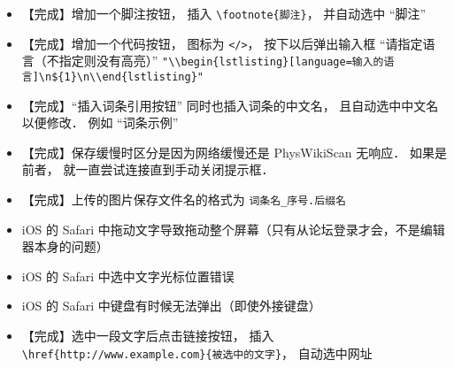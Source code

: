 \begin{itemize}
\item 【完成】增加一个脚注按钮， 插入 \lstinline|\footnote{脚注}|， 并自动选中 “脚注”

\item 【完成】增加一个代码按钮， 图标为 \lstinline|</>|， 按下以后弹出输入框 “请指定语言（不指定则没有高亮）” \lstinline|"\\begin{lstlisting}[language=输入的语言]\n${1}\n\\end{lstlisting}"|

\item 【完成】“插入词条引用按钮” 同时也插入词条的中文名， 且自动选中中文名以便修改． 例如 “词条示例”

\item 【完成】保存缓慢时区分是因为网络缓慢还是 PhysWikiScan 无响应． 如果是前者， 就一直尝试连接直到手动关闭提示框．

\item 【完成】上传的图片保存文件名的格式为 \verb|词条名_序号.后缀名|

\item iOS 的 Safari 中拖动文字导致拖动整个屏幕（只有从论坛登录才会，不是编辑器本身的问题）

\item iOS 的 Safari 中选中文字光标位置错误

\item iOS 的 Safari 中键盘有时候无法弹出（即使外接键盘）

\item 【完成】选中一段文字后点击链接按钮， 插入 \lstinline|\href{http://www.example.com}{被选中的文字}|， 自动选中网址
\end{itemize}

